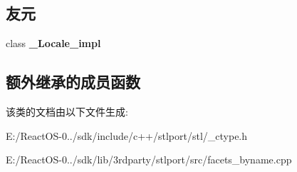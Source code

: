 \subsection*{友元}
\begin{DoxyCompactItemize}
\item 
\mbox{\label{classctype__byname_3_01wchar__t_01_4_ae9c09ac7cd16ad35f8fdb1587ac77eb8}} 
class {\bfseries \+\_\+\+Locale\+\_\+impl}
\end{DoxyCompactItemize}
\subsection*{额外继承的成员函数}


该类的文档由以下文件生成\+:\begin{DoxyCompactItemize}
\item 
E\+:/\+React\+O\+S-\/0../sdk/include/c++/stlport/stl/\+\_\+ctype.\+h\item 
E\+:/\+React\+O\+S-\/0../sdk/lib/3rdparty/stlport/src/facets\+\_\+byname.\+cpp\end{DoxyCompactItemize}
